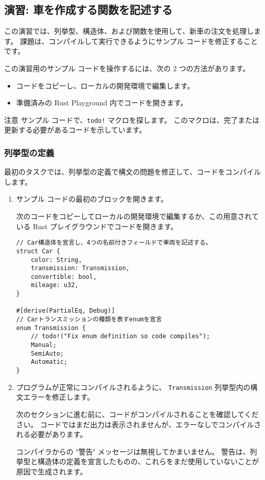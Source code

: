 \subsection{演習: 車を作成する関数を記述する}

この演習では、列挙型、構造体、および関数を使用して、新車の注文を処理します。 課題は、コンパイルして実行できるようにサンプル コードを修正することです。

この演習用のサンプル コードを操作するには、次の 2 つの方法があります。

\begin{itemize}
\item コードをコピーし、ローカルの開発環境で編集します。
\item 準備済みの Rust Playground 内でコードを開きます。
\end{itemize}

\begin{itembox}[l]{注意}
サンプル コードで、\texttt{todo!} マクロを探します。 このマクロは、完了または更新する必要があるコードを示しています。
\end{itembox}

\subsubsection{列挙型の定義}

最初のタスクでは、列挙型の定義で構文の問題を修正して、コードをコンパイルします。

\begin{enumerate}

\item サンプル コードの最初のブロックを開きます。

次のコードをコピーしてローカルの開発環境で編集するか、この用意されている Rust プレイグラウンドでコードを開きます。


\begin{lstlisting}[numbers=none]
// Car構造体を宣言し、4つの名前付きフィールドで車両を記述する。
struct Car {
    color: String,
    transmission: Transmission,
    convertible: bool,
    mileage: u32,
}

#[derive(PartialEq, Debug)]
// Carトランスミッションの種類を表すenumを宣言
enum Transmission {
    // todo!("Fix enum definition so code compiles");
    Manual;
    SemiAuto;
    Automatic;
}
\end{lstlisting}

\item プログラムが正常にコンパイルされるように、 \texttt{Transmission} 列挙型内の構文エラーを修正します。

次のセクションに進む前に、コードがコンパイルされることを確認してください。 コードではまだ出力は表示されませんが、エラーなしでコンパイルされる必要があります。

コンパイラからの "警告" メッセージは無視してかまいません。 警告は、列挙型と構造体の定義を宣言したものの、これらをまだ使用していないことが原因で生成されます。

\end{enumerate}

